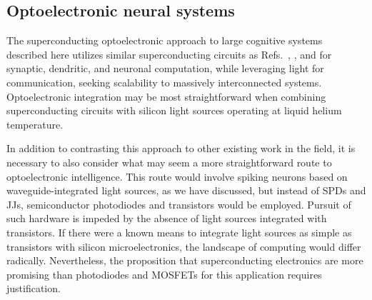 \documentclass[twocolumn]{article}
\newcommand{\onlinecite}[1]{\hspace{-1 ex} \nocite{#1}\citenum{#1}}
\begin{document}
\subsection{Optoelectronic neural systems}
The superconducting optoelectronic approach to large cognitive systems described here utilizes similar superconducting circuits as Refs.\,\onlinecite{hias2007},\onlinecite{sele2017}, and \onlinecite{scdo2018} for synaptic, dendritic, and neuronal computation, while leveraging light for communication, seeking scalability to massively interconnected systems. Optoelectronic integration may be most straightforward when combining superconducting circuits with silicon light sources operating at liquid helium temperature.

In addition to contrasting this approach to other existing work in the field, it is necessary to also consider what may seem a more straightforward route to optoelectronic intelligence. This route would involve spiking neurons based on waveguide-integrated light sources, as we have discussed, but instead of SPDs and JJs, semiconductor photodiodes and transistors would be employed. Pursuit of such hardware is impeded by the absence of light sources integrated with transistors. If there were a known means to integrate light sources as simple as transistors with silicon microelectronics, the landscape of computing would differ radically. Nevertheless, the proposition that superconducting electronics are more promising than photodiodes and MOSFETs for this application requires justification.
\end{document}
